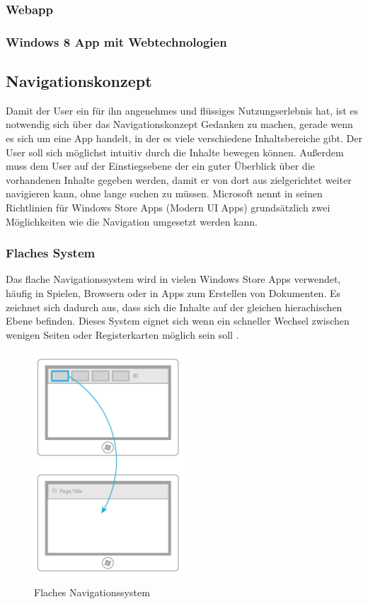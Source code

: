 \documentclass[12pt,a4paper]{scrartcl}
\begin{document}
\subsubsection{Webapp}
\label{subsubsec:webapp} 
 
\subsubsection{Windows 8 App mit Webtechnologien}
\label{subsubsec:webwin8}

\subsection{Navigationskonzept}
\label{subsec:navikonzept}
Damit der User ein für ihn angenehmes und flüssiges Nutzungserlebnis hat, ist es notwendig sich über das Navigationskonzept Gedanken zu machen, gerade wenn es sich um eine App handelt, in der es viele verschiedene Inhaltsbereiche gibt. Der User soll sich möglichst intuitiv durch die Inhalte bewegen können. Außerdem muss dem User auf der Einstiegsebene der ein guter Überblick über die vorhandenen Inhalte gegeben werden, damit er von dort aus zielgerichtet weiter navigieren kann, ohne lange suchen zu müssen. Microsoft nennt in seinen Richtlinien für Windows Store Apps (Modern UI Apps) grundsätzlich zwei Möglichkeiten wie die Navigation umgesetzt werden kann.

\subsubsection{Flaches System}
\label{subsubsec:flachessystem}
Das flache Navigationssystem wird in vielen Windows Store Apps verwendet, häufig in Spielen, Browsern oder in Apps zum Erstellen von Dokumenten. Es zeichnet sich dadurch aus, dass sich die Inhalte auf der gleichen hierachischen Ebene befinden. Dieses System eignet sich wenn ein schneller Wechsel zwischen wenigen Seiten oder Registerkarten möglich sein soll \citep{MicrosoftNavidesign2013}.

\begin{figure}[h]	
	\centering
	\includegraphics[scale=1]{Bilder/Abbildungen/ms_navigation_flach} 
	\caption{Flaches Navigationssystem \protect\citep{MicrosoftNavidesign2013}}
	\label{fig:naviflach}
\end{figure}
\end{document}
